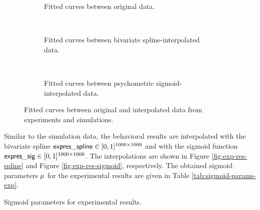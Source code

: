 \begin{multicols}{2}
\begin{figure}[H]
     \centering
    \begin{subfigure}[t]{0.41\textwidth}
        \centering
        
        \caption{Fitted curves between original data.}
        \label{fig:relationship-fit-original}
    \end{subfigure}
    \\ \vspace{\baselineskip}
    \begin{subfigure}[t]{0.41\textwidth}
        \centering
        
        \caption{Fitted curves between bivariate spline-interpolated data.}
        \label{fig:relationship-fit-spline}
    \end{subfigure}
    \\ \vspace{\baselineskip}
    \begin{subfigure}[t]{0.41\textwidth}
        \centering
        
        \caption{Fitted curves between psychometric sigmoid-interpolated data.}
        \label{fig:relationship-fit-sigmoid}
    \end{subfigure}
    \caption[Simulations-experiments relationships with fitted curves]{Fitted curves between original and interpolated data from experiments and simulations.}
    \label{fig:all-fit-relationships}
\end{figure}

\end{multicols}

Similar to the simulation data, 
the behavioral results are interpolated with the bivariate spline $\mathsf{expres\_spline} \in [0, 1]^{1000 \times 1000}$ and with the sigmoid function $\mathsf{expres\_sig} \in [0, 1]^{1000 \times 1000}$. The interpolations are shown in Figure \ref{fig:exp-res-spline} and Figure \ref{fig:exp-res-sigmoid}, respectively. The obtained sigmoid parameters $\mu$ for the experimental results are given in Table \ref{tab:sigmoid-params-exp}.

\begin{table}[!htp]
    \centering
    
    \caption[Sigmoid parameters for experimental results]{Sigmoid parameters for experimental results.}
    \label{tab:sigmoid-params-exp}
\end{table}